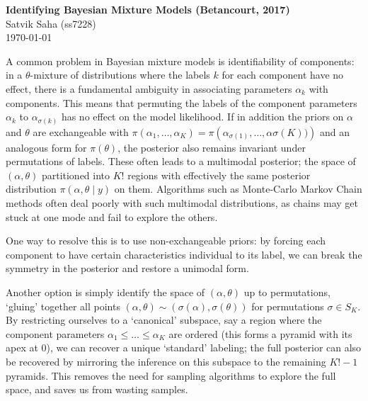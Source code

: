 \documentclass[12pt]{article}
\begin{document}
\begin{flushleft}
\textbf{%
    Identifying Bayesian Mixture Models (Betancourt, 2017)
} \\
Satvik Saha (ss7228) \\
\today
\end{flushleft}

\vspace{0.1in}


A common problem in Bayesian mixture models is identifiability of components:
in a $\theta$-mixture of distributions where the labels $k$ for each component
have no effect, there is a fundamental ambiguity in associating parameters
$\alpha_k$ with components.
This means that permuting the labels of the component parameters $\alpha_k$ to
$\alpha_{\sigma(k)}$ has no effect on the model likelihood.
If in addition the priors on $\alpha$ and $\theta$ are exchangeable with
$\pi(\alpha_1, \dots, \alpha_K) = \pi(\alpha_{\sigma(1)}, \dots,
\alpha{\sigma(K))})$ and an analogous form for $\pi(\theta)$, the posterior
also remains invariant under permutations of labels.
These often leads to a multimodal posterior; the space of $(\alpha, \theta)$
partitioned into $K!$ regions with effectively the same posterior distribution
$\pi(\alpha, \theta \mid y)$ on them.
Algorithms such as Monte-Carlo Markov Chain methods often deal poorly with such
multimodal distributions, as chains may get stuck at one mode and fail to
explore the others.

One way to resolve this is to use non-exchangeable priors: by forcing each
component to have certain characteristics individual to its label, we can break
the symmetry in the posterior and restore a unimodal form.

Another option is simply identify the space of $(\alpha, \theta)$ up to
permutations, `gluing' together all points $(\alpha, \theta) \sim
(\sigma(\alpha), \sigma(\theta))$ for permutations $\sigma \in S_K$.
By restricting ourselves to a `canonical' subspace, say a region where the
component parameters $\alpha_1 \leq \dots \leq \alpha_K$ are ordered (this
forms a pyramid with its apex at $0$), we can recover a unique `standard'
labeling; the full posterior can also be recovered by mirroring the inference
on this subspace to the remaining $K! - 1$ pyramids.
This removes the need for sampling algorithms to explore the full space, and
saves us from wasting samples.




% 

% 
\end{document}
